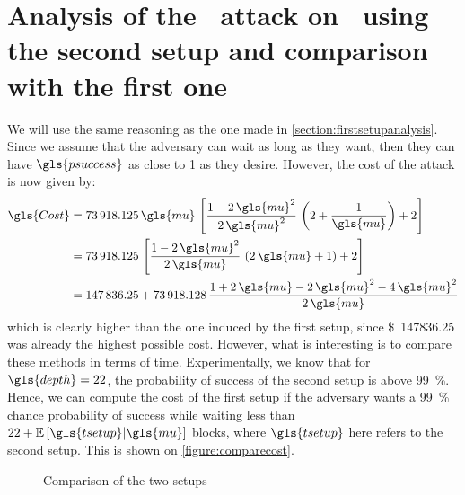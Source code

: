 \section{Analysis of the \cs\ attack on \FC\ using the second setup and comparison with the first one}
We will use the same reasoning as the one made in \autoref{section:firstsetupanalysis}. Since we assume that the adversary can wait as long as they want, then they can have \(\gls{psuccess}\) as close to 1 as they desire. However, the cost of the attack is now given by:
\begin{align*}
    \gls{Cost} &= \num{73918.125}\,\gls{mu}\,\left[\frac{1-2\,\gls{mu}^2}{2\,\gls{mu}^2}\,\left(2+\frac{1}{\gls{mu}}\right)+2\right]\\
    &= \num{73918.125}\,\left[\frac{1-2\,\gls{mu}^2}{2\,\gls{mu}}\,\left(2\,\gls{mu}+1\right)+2\right]\\
    &= \num{147836.25} + \num{73918.128}\,\frac{1+2\,\gls{mu}-2\,\gls{mu}^2-4\,\gls{mu}^2}{2\,\gls{mu}}
\end{align*}
which is clearly higher than the one induced by the first setup, since \SI{147836.25}[\$]{} was already the highest possible cost. However, what is interesting is to compare these methods in terms of time. Experimentally, we know that for \(\gls{depth}=22\), the probability of success of the second setup is above \SI{99}{\percent}. Hence, we can compute the cost of the first setup if the adversary wants a \SI{99}{\percent} chance probability of success while waiting less than \(22+\ES{\gls{tsetup}}{\gls{mu}}\) blocks, where \(\gls{tsetup}\) here refers to the second setup. This is shown on \autoref{figure:comparecost}.

\begin{figure}[ht]
    \centering
    \caption{Comparison of the two setups}
    \label{figure:comparecost}
\end{figure}


